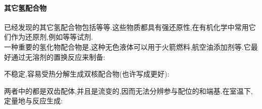 \documentclass{ctexart}
\begin{document}
\paragraph{其它氢配合物}
已经发现的其它氢配合物包括等等.这些物质都具有强还原性,在有机化学中常用它们作为还原剂,例如等等试剂.\\
\indent 一种重要的氢化物配合物是,这种无色液体可以用于火箭燃料,航空油添加剂等.它最好通过无溶剂的置换反应来制备:
\begin{center}
\end{center}
不稳定,容易受热分解生成双核配合物(也许写成更好):
\begin{center}
\end{center}
两者中的都是双齿配体,并且是流变的,因而无法分辨参与配位的和端基.在室温下,定量地与反应生成:
\begin{center}
\end{center}
\end{document}
